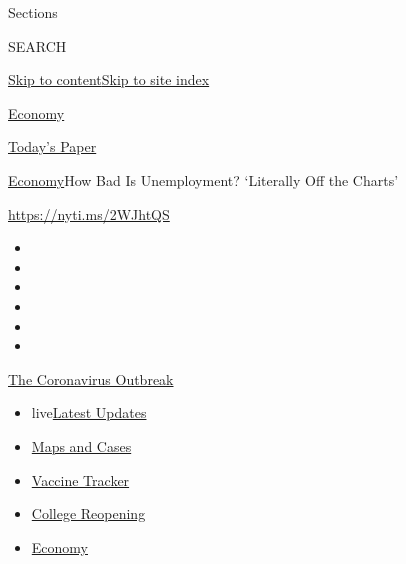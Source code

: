 Sections

SEARCH

\protect\hyperlink{site-content}{Skip to
content}\protect\hyperlink{site-index}{Skip to site index}

\href{https://www.nytimes3xbfgragh.onion/section/business/economy}{Economy}

\href{https://myaccount.nytimes3xbfgragh.onion/auth/login?response_type=cookie\&client_id=vi}{}

\href{https://www.nytimes3xbfgragh.onion/section/todayspaper}{Today's
Paper}

\href{/section/business/economy}{Economy}\textbar{}How Bad Is
Unemployment? `Literally Off the Charts'

\url{https://nyti.ms/2WJhtQS}

\begin{itemize}
\item
\item
\item
\item
\item
\item
\end{itemize}

\href{https://www.nytimes3xbfgragh.onion/news-event/coronavirus?action=click\&pgtype=Article\&state=default\&region=TOP_BANNER\&context=storylines_menu}{The
Coronavirus Outbreak}

\begin{itemize}
\tightlist
\item
  live\href{https://www.nytimes3xbfgragh.onion/2020/08/04/world/coronavirus-cases.html?action=click\&pgtype=Article\&state=default\&region=TOP_BANNER\&context=storylines_menu}{Latest
  Updates}
\item
  \href{https://www.nytimes3xbfgragh.onion/interactive/2020/us/coronavirus-us-cases.html?action=click\&pgtype=Article\&state=default\&region=TOP_BANNER\&context=storylines_menu}{Maps
  and Cases}
\item
  \href{https://www.nytimes3xbfgragh.onion/interactive/2020/science/coronavirus-vaccine-tracker.html?action=click\&pgtype=Article\&state=default\&region=TOP_BANNER\&context=storylines_menu}{Vaccine
  Tracker}
\item
  \href{https://www.nytimes3xbfgragh.onion/2020/08/02/us/covid-college-reopening.html?action=click\&pgtype=Article\&state=default\&region=TOP_BANNER\&context=storylines_menu}{College
  Reopening}
\item
  \href{https://www.nytimes3xbfgragh.onion/live/2020/08/04/business/stock-market-today-coronavirus?action=click\&pgtype=Article\&state=default\&region=TOP_BANNER\&context=storylines_menu}{Economy}
\end{itemize}

